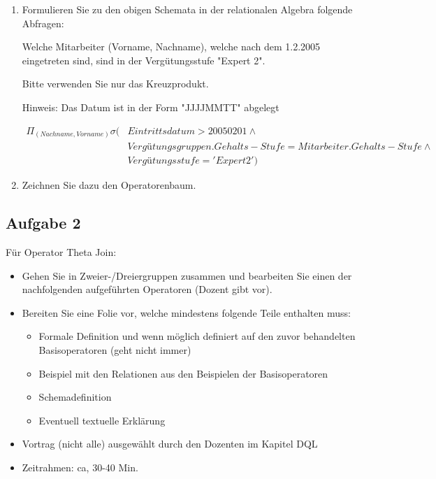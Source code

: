 \documentclass[a4paper]{article}
\begin{document}
\begin{enumerate}
    \item Formulieren Sie zu den obigen Schemata in der relationalen Algebra folgende Abfragen:
    
    Welche Mitarbeiter (Vorname, Nachname), welche nach dem 1.2.2005 eingetreten sind, sind in der Vergütungsstufe "Expert 2".

    Bitte verwenden Sie nur das Kreuzprodukt.

    Hinweis: Das Datum ist in der Form "JJJJMMTT" abgelegt

    \begin{align*}
        \Pi_{(Nachname, Vorname)} \sigma ( & Eintrittsdatum>20050201 \wedge \\
        & Vergütungsgruppen.Gehalts-Stufe=Mitarbeiter.Gehalts-Stufe \wedge \\
        & Vergütungsstufe='Expert 2')
    \end{align*}

    \item Zeichnen Sie dazu den Operatorenbaum.
\end{enumerate}

\subsection{Aufgabe 2}

Für Operator Theta Join:

\begin{itemize}
    \item Gehen Sie in Zweier-/Dreiergruppen zusammen und bearbeiten Sie einen der nachfolgenden aufgeführten Operatoren (Dozent gibt vor).
    \item Bereiten Sie eine Folie vor, welche mindestens folgende Teile enthalten muss:
    \begin{itemize}
        \item Formale Definition und wenn möglich definiert auf den zuvor behandelten Basisoperatoren (geht nicht immer)
        \item Beispiel mit den Relationen aus den Beispielen der Basisoperatoren
        \item Schemadefinition
        \item Eventuell textuelle Erklärung
    \end{itemize}
    \item Vortrag (nicht alle) ausgewählt durch den Dozenten im Kapitel DQL
    \item Zeitrahmen: ca, 30-40 Min.
\end{itemize}
\end{document}
